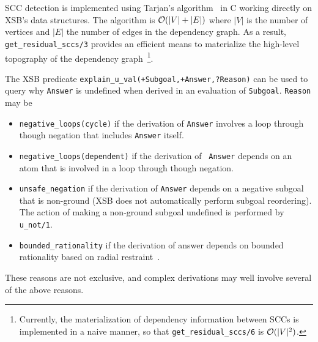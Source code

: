 \begin{description}
SCC detection is implemented using Tarjan's algorithm~\cite{Tarj72} in
C working directly on XSB's data structures.  The algorithm is
${\cal O}(|V| + |E|)$ where $|V|$ is the number of vertices and $|E|$ the
number of edges in the dependency graph.  As a result, {\tt
  get\_residual\_sccs/3} provides an efficient means to materialize
the high-level topography of the dependency graph~\footnote{Currently,
  the materialization of dependency information between SCCs is
  implemented in a naive manner, so that {\tt get\_residual\_sccs/6}
  is ${\cal O}(|V|^2)$.}.

  
%
The XSB predicate
%
{\tt explain\_u\_val(+Subgoal,+Answer,?Reason)}
\noindent
can be used to query why {\tt Answer} is undefined when derived in an
evaluation of {\tt Subgoal}.  {\tt Reason} may be
\begin{itemize}
\item {\tt negative\_loops(cycle)} if the derivation of {\tt Answer} involves a
  loop through though negation that includes {\tt Answer} itself.
%
\item {\tt negative\_loops(dependent)} if the derivation of {\tt
  Answer} depends on an atom that is involved in a loop through though
  negation.
%
\item {\tt unsafe\_negation} if the derivation of {\tt Answer} depends
  on a negative subgoal that is non-ground (XSB does not automatically
  perform subgoal reordering).  The action of making a non-ground
  subgoal undefined is performed by {\tt u\_not/1}.
%
\item {\tt bounded\_rationality} if the derivation of answer depends
  on bounded rationality based on radial restraint~\cite{GroS13}.
\end{itemize}
%
These reasons are not exclusive, and complex derivations may well
involve several of the above reasons.


\end{description}
